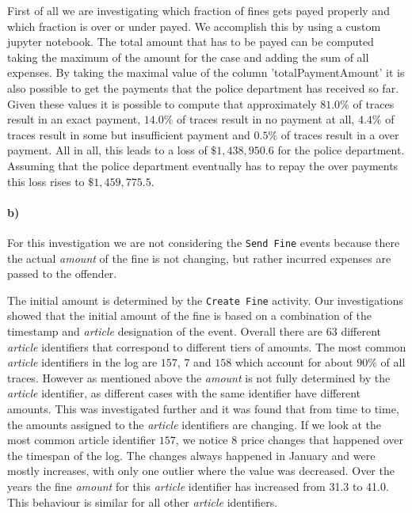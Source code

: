 \documentclass[12pt]{report}
\begin{document}
First of all we are investigating which fraction of fines gets payed properly and which fraction is over or under payed. We accomplish this by using a custom jupyter notebook. The total amount that has to be payed can be computed taking the maximum of the amount for the case and adding the sum of all expenses. By taking the maximal value of the column 'totalPaymentAmount' it is also possible to get the payments that the police department has received so far. Given these values it is possible to compute that approximately $81.0\%$ of traces result in an exact payment, $14.0\%$ of traces result in no payment at all, $4.4\%$ of traces result in some but insufficient payment and $0.5\%$ of traces result in a over payment. All in all, this leads to a loss of $ \$ 1,438,950.6$ for the police department. Assuming that the police department eventually has to repay the over payments this loss rises to $ \$ 1,459,775.5 $.

\paragraph{\textbf{b)}}
For this investigation we are not considering the \texttt{Send Fine} events because there the actual \emph{amount} of the fine is not changing, but rather incurred expenses are passed to the offender.

The initial amount is determined by the \texttt{Create Fine} activity. Our investigations showed that the initial amount of the fine is based on a combination of the timestamp and \emph{article} designation of the event. Overall there are 63 different \emph{article} identifiers that correspond to different tiers of amounts. The most common \emph{article} identifiers in the log are $157$, $7$ and $158$ which account for about $90\%$ of all traces. However as mentioned above the \emph{amount} is not fully determined by the \emph{article} identifier, as different cases with the same identifier have different amounts. This was investigated further and it was found that from time to time, the amounts assigned to the \emph{article} identifiers are changing. If we look at the most common article identifier $157$, we notice 8 price changes that happened over the timespan of the log. The changes always happened in January and were mostly increases, with only one outlier where the value was decreased. Over the years the fine \emph{amount} for this \emph{article} identifier has increased from 31.3 to 41.0. This behaviour is similar for all other \emph{article} identifiers.
\end{document}
